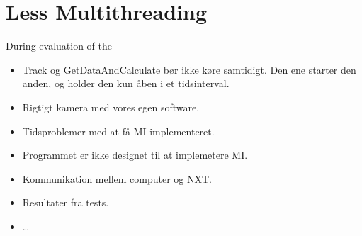 \section{Less Multithreading}
During evaluation of the

\begin{itemize}
  \item Track og GetDataAndCalculate bør ikke køre samtidigt. Den ene starter
  den anden, og holder den kun åben i et tidsinterval.
  \item Rigtigt kamera med vores egen software.
  \item Tidsproblemer med at få MI implementeret.
  \item Programmet er ikke designet til at implemetere MI.
  \item Kommunikation mellem computer og NXT.
  \item Resultater fra tests.
  \item \ldots
\end{itemize}
